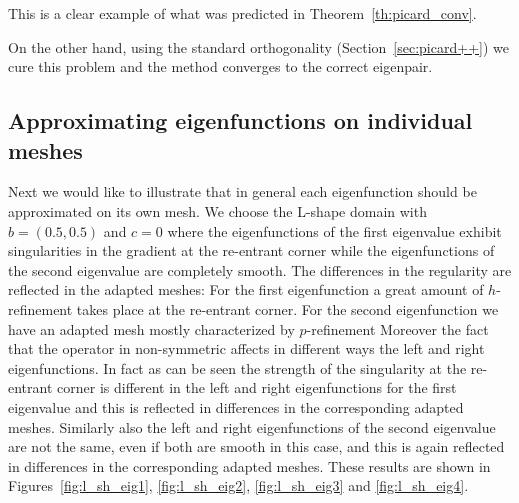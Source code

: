 \documentclass[smallextended]{svjour3}
\begin{document}
\vspace{4mm}
\noindent
This is a clear example of what was predicted in Theorem~\ref{th:picard_conv}.

On the other hand, using the standard orthogonality (Section~\ref{sec:picard++}) we cure this problem and the method 
converges to the correct eigenpair. 


\subsection{Approximating eigenfunctions on individual meshes}\label{ssec:n_adapt}

Next we would like to illustrate that in general each eigenfunction should be approximated on its own mesh.
We choose the L-shape domain with $b=(0.5,0.5)$ and $c=0$ where the eigenfunctions of the first eigenvalue exhibit  
singularities in the gradient at the re-entrant corner while the eigenfunctions of the second eigenvalue are completely smooth.
The differences in the regularity are reflected in the adapted meshes: 
For the first eigenfunction a great amount of $h$-refinement takes place at the re-entrant corner. 
For the second eigenfunction we have an adapted mesh mostly characterized by $p$-refinement
Moreover the fact that the operator in non-symmetric affects in different ways the left and right eigenfunctions. 
In fact as can be seen the strength of the singularity at the re-entrant corner is different in the left and right eigenfunctions for the first eigenvalue and this is reflected in differences in the corresponding adapted meshes.
Similarly also the left and right eigenfunctions of the second eigenvalue are not the same, even if both are smooth in this case, and this is again reflected in differences in the corresponding adapted meshes.
These results are shown in Figures~\ref{fig:l_sh_eig1}, \ref{fig:l_sh_eig2}, \ref{fig:l_sh_eig3} and \ref{fig:l_sh_eig4}.
\end{document}

